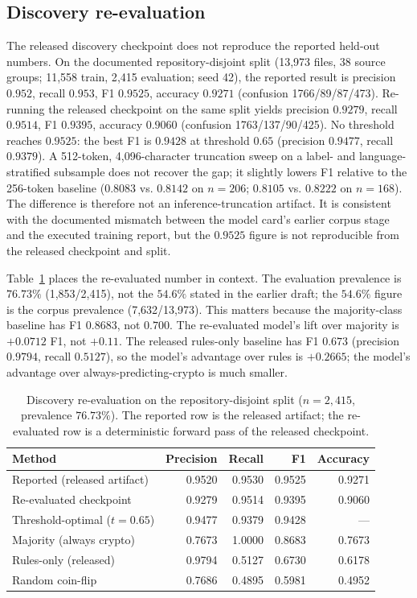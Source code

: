\documentclass[conference,10pt]{IEEEtran}
\begin{document}
\subsection{Discovery re-evaluation}
The released discovery checkpoint does not reproduce the reported held-out numbers. On the
documented repository-disjoint split (13{,}973 files, 38 source groups; 11{,}558 train, 2{,}415
evaluation; seed 42), the reported result is precision $0.952$, recall $0.953$, F1 $0.9525$,
accuracy $0.9271$ (confusion 1766/89/87/473). Re-running the released checkpoint on the same
split yields precision $0.9279$, recall $0.9514$, F1 $0.9395$, accuracy $0.9060$ (confusion
1763/137/90/425). No threshold reaches $0.9525$: the best F1 is $0.9428$ at threshold $0.65$
(precision $0.9477$, recall $0.9379$). A 512-token, 4{,}096-character truncation sweep on a
label- and language-stratified subsample does not recover the gap; it slightly lowers F1
relative to the 256-token baseline ($0.8083$ vs. $0.8142$ on $n=206$; $0.8105$ vs. $0.8222$ on
$n=168$). The difference is therefore not an inference-truncation artifact. It is consistent
with the documented mismatch between the model card's earlier corpus stage and the executed
training report, but the $0.9525$ figure is not reproducible from the released checkpoint and
split.

Table~\ref{tab:discovery} places the re-evaluated number in context. The evaluation prevalence
is $76.73\%$ (1{,}853/2{,}415), not the $54.6\%$ stated in the earlier draft; the $54.6\%$
figure is the corpus prevalence (7{,}632/13{,}973). This matters because the majority-class
baseline has F1 $0.8683$, not $0.700$. The re-evaluated model's lift over majority is $+0.0712$
F1, not $+0.11$. The released rules-only baseline has F1 $0.673$ (precision $0.9794$, recall
$0.5127$), so the model's advantage over rules is $+0.2665$; the model's advantage over
always-predicting-crypto is much smaller.

\begin{table}[t]
\centering
\caption{Discovery re-evaluation on the repository-disjoint split ($n=2{,}415$, prevalence
$76.73\%$). The reported row is the released artifact; the re-evaluated row is a deterministic
forward pass of the released checkpoint.}
\label{tab:discovery}
\footnotesize
\begin{tabular}{@{}>{\raggedright\arraybackslash}p{2.55cm}rrrr@{}}
\toprule
Method & Precision & Recall & F1 & Accuracy \\
\midrule
Reported (released artifact) & 0.9520 & 0.9530 & 0.9525 & 0.9271 \\
Re-evaluated checkpoint & 0.9279 & 0.9514 & 0.9395 & 0.9060 \\
Threshold-optimal ($t=0.65$) & 0.9477 & 0.9379 & 0.9428 & --- \\
Majority (always crypto) & 0.7673 & 1.0000 & 0.8683 & 0.7673 \\
Rules-only (released) & 0.9794 & 0.5127 & 0.6730 & 0.6178 \\
Random coin-flip & 0.7686 & 0.4895 & 0.5981 & 0.4952 \\
\bottomrule
\end{tabular}
\end{table}
\end{document}
